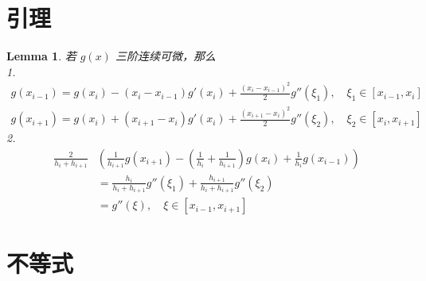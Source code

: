 \documentclass{ctexart}
\newtheorem{lemma}[theorem]{Lemma}
\theoremstyle{definition}
\theoremstyle{remark}
\numberwithin{equation}{section}
\begin{document}
\appendix

\section{引理}

\begin{lemma} \label{lmm:D2simd2}
    若 \(g(x)\) 三阶连续可微，那么\\
    1.
    \begin{gather*}
        g(x_{i-1}) = g(x_{i}) - (x_{i}-x_{i-1}) g'(x_{i}) + \frac{(x_{i}-x_{i-1})^2}{2} g''(\xi_1), \quad \xi_1 \in [x_{i-1}, x_{i}]        \\
        g(x_{i+1}) = g(x_{i}) + (x_{i+1}-x_{i}) g'(x_{i}) + \frac{(x_{i+1}-x_{i})^2}{2} g''(\xi_2), \quad \xi_2 \in [x_{i}, x_{i+1}]
    \end{gather*}
    2.
    \begin{equation}
        \begin{aligned}
            \frac{2}{h_i + h_{i+1}} &\left( \frac{1}{h_{i+1}} g(x_{i+1}) - (\frac{1}{h_{i}}+\frac{1}{h_{i+1}})g(x_{i}) + \frac{1}{h_{i}} g(x_{i-1}) \right) \\
            &= \frac{h_i}{h_i + h_{i+1}} g''(\xi_1) + \frac{h_{i+1}}{h_i + h_{i+1}} g''(\xi_2)  \\
            &= g''(\xi), \quad \xi \in [x_{i-1}, x_{i+1}]
        \end{aligned}
    \end{equation}
\end{lemma}

\section{不等式}
\end{document}
